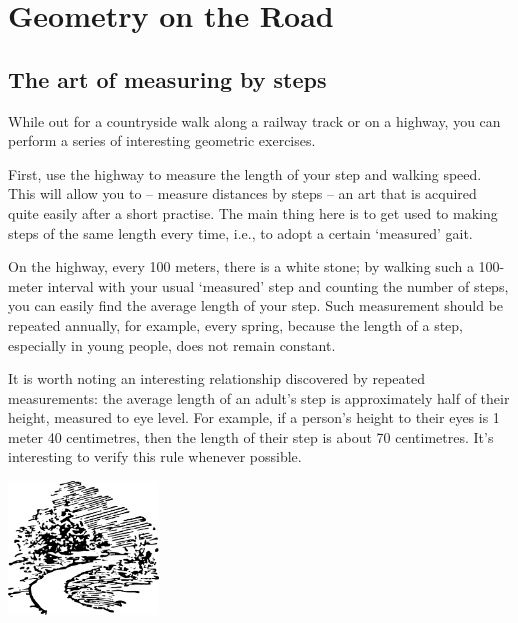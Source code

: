 

\chapter{Geometry on the Road}
\label{ch-04}

\section{The art of measuring by steps}
\label{sec-4.1}


While out for a countryside walk along a railway track or on a highway, you can perform a series of interesting geometric exercises.

First, use the highway to measure the length of your step and walking speed. This will allow you to -- measure distances by steps -- an art that is acquired quite easily after a short practise. The main thing here is to get used to making steps of the same length every time, i.e., to adopt a certain `measured' gait.

On the highway, every 100 meters, there is a white stone; by walking such a 100-meter interval with your usual `measured' step and counting the number of steps, you can easily find the average length of your step. Such measurement should be repeated annually, for example, every spring, because the length of a step, especially in young people, does not remain constant.

It is worth noting an interesting relationship discovered by repeated measurements: the average length of an adult's step is approximately half of their height, measured to eye level. For example, if a person's height to their eyes is 1 meter 40 centimetres, then the length of their step is about 70 centimetres. It's interesting to verify this rule whenever possible.

\begin{center}
\includegraphics[width=0.3\textwidth]{figures/ch-04/fig-ch-04-tail.pdf}
\end{center}


















